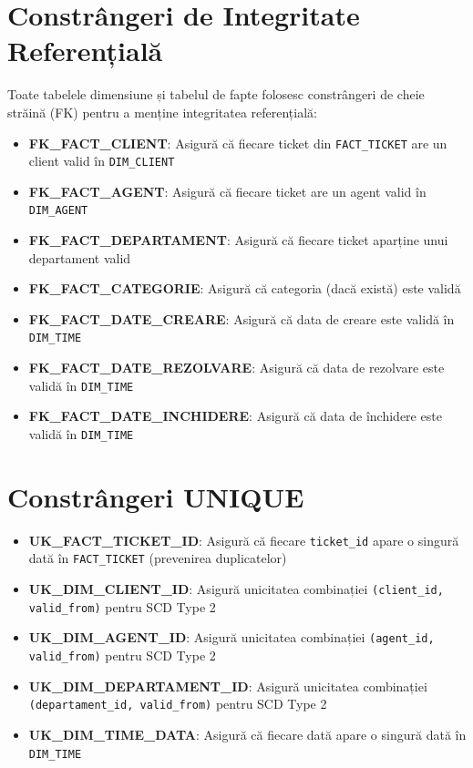 \section{Constrângeri de Integritate Referențială}

Toate tabelele dimensiune și tabelul de fapte folosesc constrângeri de cheie străină (FK) pentru a menține integritatea referențială:

\begin{itemize}
    \item \textbf{FK\_FACT\_CLIENT}: Asigură că fiecare ticket din \texttt{FACT\_TICKET} are un client valid în \texttt{DIM\_CLIENT}
    \item \textbf{FK\_FACT\_AGENT}: Asigură că fiecare ticket are un agent valid în \texttt{DIM\_AGENT}
    \item \textbf{FK\_FACT\_DEPARTAMENT}: Asigură că fiecare ticket aparține unui departament valid
    \item \textbf{FK\_FACT\_CATEGORIE}: Asigură că categoria (dacă există) este validă
    \item \textbf{FK\_FACT\_DATE\_CREARE}: Asigură că data de creare este validă în \texttt{DIM\_TIME}
    \item \textbf{FK\_FACT\_DATE\_REZOLVARE}: Asigură că data de rezolvare este validă în \texttt{DIM\_TIME}
    \item \textbf{FK\_FACT\_DATE\_INCHIDERE}: Asigură că data de închidere este validă în \texttt{DIM\_TIME}
\end{itemize}

\section{Constrângeri UNIQUE}

\begin{itemize}
    \item \textbf{UK\_FACT\_TICKET\_ID}: Asigură că fiecare \texttt{ticket\_id} apare o singură dată în \texttt{FACT\_TICKET} (prevenirea duplicatelor)
    \item \textbf{UK\_DIM\_CLIENT\_ID}: Asigură unicitatea combinației \texttt{(client\_id, valid\_from)} pentru SCD Type 2
    \item \textbf{UK\_DIM\_AGENT\_ID}: Asigură unicitatea combinației \texttt{(agent\_id, valid\_from)} pentru SCD Type 2
    \item \textbf{UK\_DIM\_DEPARTAMENT\_ID}: Asigură unicitatea combinației \texttt{(departament\_id, valid\_from)} pentru SCD Type 2
    \item \textbf{UK\_DIM\_TIME\_DATA}: Asigură că fiecare dată apare o singură dată în \texttt{DIM\_TIME}
\end{itemize}

